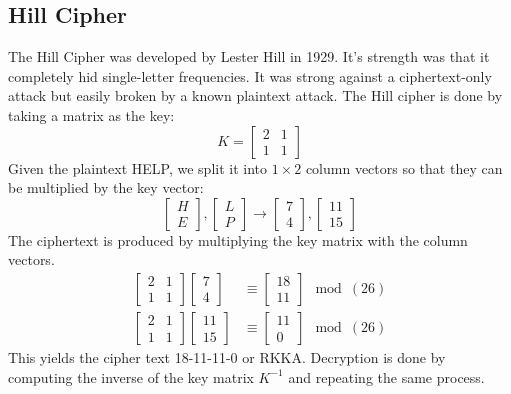 \documentclass{math}
\begin{document}
\subsection*{Hill Cipher}
The Hill Cipher was developed by Lester Hill in 1929. It's strength was that it
completely hid single-letter frequencies. It was strong against a
ciphertext-only attack but easily broken by a known plaintext attack. The Hill
cipher is done by taking a matrix as the key:
\[ K = \begin{bmatrix}2 & 1 \\ 1 & 1\end{bmatrix} \]
Given the plaintext HELP, we split it into \( 1\times2 \) column vectors so
that they can be multiplied by the key vector:
\[ \begin{bmatrix}H \\ E\end{bmatrix},
  \begin{bmatrix}L \\ P\end{bmatrix}\to
  \begin{bmatrix}7 \\ 4\end{bmatrix},
  \begin{bmatrix}11 \\ 15\end{bmatrix} \]
The ciphertext is produced by multiplying the key matrix with the column
vectors.
\begin{align*}
  \begin{bmatrix}2 & 1 \\ 1 & 1\end{bmatrix}
    \begin{bmatrix}7 \\ 4\end{bmatrix} &\equiv
    \begin{bmatrix}18 \\ 11\end{bmatrix}\mod(26) \\
  \begin{bmatrix}2 & 1 \\ 1 & 1\end{bmatrix}
    \begin{bmatrix}11 \\ 15\end{bmatrix} &\equiv
    \begin{bmatrix}11 \\ 0\end{bmatrix}\mod(26)
\end{align*}
This yields the cipher text 18-11-11-0 or RKKA. Decryption is done by computing
the inverse of the key matrix \( K^{-1} \) and repeating the same process.
\end{document}
